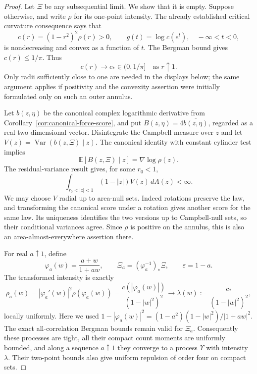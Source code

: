 \documentclass[11pt,a4paper]{article}
\numberwithin{equation}{section}
\theoremstyle{definition}
\theoremstyle{remark}
\begin{document}
\begin{proof}
Let $\Xi$ be any subsequential limit. We show that it is empty.
Suppose otherwise, and write $\rho$ for its one-point intensity.
The already established critical curvature consequence says that
\[
 c(r)=(1-r^2)^2\rho(r)>0,\qquad
 g(t)=\log c(e^t),\quad -\infty<t<0,
\]
is nondecreasing and convex as a function of $t$. The Bergman bound
gives $c(r)\leq1/\pi$. Thus
\begin{equation}
 c(r)\longrightarrow c_*\in(0,1/\pi]
 \quad\text{as }r\uparrow1.
 \label{eq:critical-mobius-positive-boundary-coefficient}
\end{equation}
Only radii sufficiently close to one are needed in the displays below;
the same argument applies if positivity and the convexity assertion
were initially formulated only on such an outer annulus.

Let $b(z,\eta)$ be the canonical complex logarithmic derivative from
Corollary~\ref{cor:canonical-force-score}, and put
$B(z,\eta)=4\overline{b(z,\eta)}$, regarded as a real two-dimensional
vector. Disintegrate the Campbell measure over $z$ and let
$V(z)=\operatorname{Var}(b(z,\Xi)\mid z)$.
The canonical identity with constant cylinder test implies
\[
 \mathbb E[B(z,\Xi)\mid z]=\nabla\log\rho(z).
\]
The residual-variance result gives, for some $r_0<1$,
\begin{equation}
 \int_{r_0<|z|<1}(1-|z|)V(z)\,dA(z)<\infty.
 \label{eq:critical-mobius-residual-input}
\end{equation}
We may choose $V$ radial up to area-null sets. Indeed rotations preserve
the law, and transforming the canonical score under a rotation gives
another score for the same law. Its uniqueness identifies the two
versions up to Campbell-null sets, so their conditional variances agree.
Since $\rho$ is positive on the annulus, this is also an area-almost-everywhere
assertion there.

For real $a\uparrow1$, define
\[
 \varphi_a(w)=\frac{a+w}{1+aw},\qquad
 \Xi_a=(\varphi_a^{-1})_*\Xi,\qquad \varepsilon=1-a.
\]
The transformed intensity is exactly
\begin{equation}
 \rho_a(w)=|\varphi_a'(w)|^2\rho(\varphi_a(w))
 =\frac{c(|\varphi_a(w)|)}{(1-|w|^2)^2}
 \longrightarrow\lambda(w):=\frac{c_*}{(1-|w|^2)^2},
 \label{eq:critical-mobius-intensity-limit}
\end{equation}
locally uniformly. Here we used
$1-|\varphi_a(w)|^2=(1-a^2)(1-|w|^2)/|1+aw|^2$.
The exact all-correlation Bergman bounds remain valid for $\Xi_a$.
Consequently these processes are tight, all their compact count moments
are uniformly bounded, and along a sequence $a\uparrow1$ they converge
to a process $\Upsilon$ with intensity $\lambda$.
Their two-point bounds also give uniform repulsion of order four on
compact sets.


\end{proof}
\end{document}
